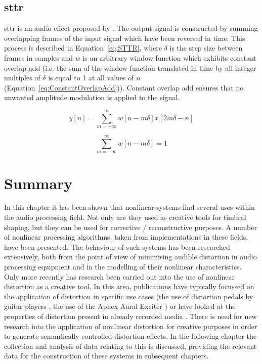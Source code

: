 	\subsection{\acrlong{sttr}}
	\label{sec:Excitation-Methods-STTR}
		\acrfull{sttr} is an audio effect proposed by \citet{kim2014shorttime}. The output signal is constructed by
		summing overlapping frames of the input signal which have been reversed in time. This process is described
		in Equation~\ref{eq:STTR}, where $\delta$ is the step size between frames in samples and $w$ is an
		arbitrary window function which exhibits constant overlap add (i.e. the sum of the window function
		translated in time by all integer multiples of $\delta$ is equal to 1 at all values of $n$
		(Equation~\ref{eq:ConstantOverlapAdd})).  Constant overlap add ensures that no unwanted amplitude
		modulation is applied to the signal.

		\begin{equation}
			y[n] = \sum_{m = -\infty}^{\infty} w[n - m\delta]x[2m\delta - n]
			\label{eq:STTR}
		\end{equation}

		\begin{equation}
			\sum_{m = -\infty}^{\infty} w[n - m\delta] = 1
			\label{eq:ConstantOverlapAdd}
		\end{equation}

\section{Summary}
\label{sec:Excitation-Summary}
	In this chapter it has been shown that nonlinear systems find several uses within the audio processing field. Not
	only are they used as creative tools for timbral shaping, but they can be used for corrective / reconstructive
	purposes. A number of nonlinear processing algorithms, taken from implementations in these fields, have been
	presented. The behaviour of such systems has been researched extensively, both from the point of view of minimising
	audible distortion in audio processing equipment and in the modelling of their nonlinear characteristics. Only more
	recently has research been carried out into the use of nonlinear distortion as a creative tool. In this area,
	publications have typically focussed on the application of distortion in specific use cases (the use of distortion
	pedals by guitar players \citep{tsumoto2016the}, the use of the Aphex Aural Exciter \citep{shekar2013modeling}) or
	have looked at the properties of distortion present in already recorded media \citep{wilson2014characterisation}.
	There is need for new research into the application of nonlinear distortion for creative purposes in order to
	generate semantically controlled distortion effects. In the following chapter the collection and analysis of data
	relating to this is discussed, providing the relevant data for the construction of these systems in subsequent
	chapters.
